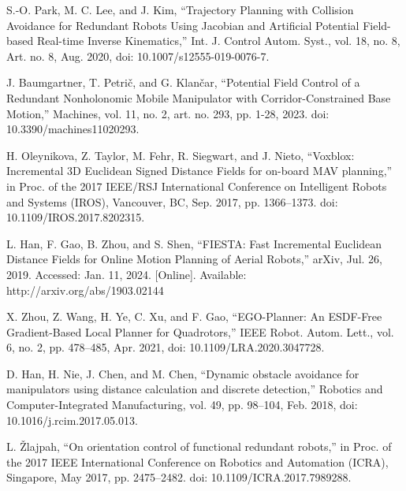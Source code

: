 \documentclass[letterpaper, 10 pt, conference]{ieeeconf}  %
\begin{document}
\begin{thebibliography}{99}
 S.-O. Park, M. C. Lee, and J. Kim, “Trajectory Planning with Collision Avoidance for Redundant Robots Using Jacobian and Artificial Potential Field-based Real-time Inverse Kinematics,” Int. J. Control Autom. Syst., vol. 18, no. 8, Art. no. 8, Aug. 2020, doi: 10.1007/s12555-019-0076-7.

J. Baumgartner, T. Petrič, and G. Klančar, “Potential Field Control of a Redundant Nonholonomic Mobile Manipulator with Corridor-Constrained Base Motion,” Machines, vol. 11, no. 2, art. no. 293, pp. 1-28, 2023. doi: 10.3390/machines11020293.

 H. Oleynikova, Z. Taylor, M. Fehr, R. Siegwart, and J. Nieto, “Voxblox: Incremental 3D Euclidean Signed Distance Fields for on-board MAV planning,” in Proc. of the 2017 IEEE/RSJ International Conference on Intelligent Robots and Systems (IROS), Vancouver, BC, Sep. 2017, pp. 1366–1373. doi: 10.1109/IROS.2017.8202315.

 L. Han, F. Gao, B. Zhou, and S. Shen, “FIESTA: Fast Incremental Euclidean Distance Fields for Online Motion Planning of Aerial Robots,” arXiv, Jul. 26, 2019. Accessed: Jan. 11, 2024. [Online]. Available: http://arxiv.org/abs/1903.02144

 X. Zhou, Z. Wang, H. Ye, C. Xu, and F. Gao, “EGO-Planner: An ESDF-Free Gradient-Based Local Planner for Quadrotors,” IEEE Robot. Autom. Lett., vol. 6, no. 2, pp. 478–485, Apr. 2021, doi: 10.1109/LRA.2020.3047728.

 D. Han, H. Nie, J. Chen, and M. Chen, “Dynamic obstacle avoidance for manipulators using distance calculation and discrete detection,” Robotics and Computer-Integrated Manufacturing, vol. 49, pp. 98–104, Feb. 2018, doi: 10.1016/j.rcim.2017.05.013.

L. Žlajpah, “On orientation control of functional redundant robots,” in Proc. of the 2017 IEEE International Conference on Robotics and Automation (ICRA), Singapore, May 2017, pp. 2475–2482. doi: 10.1109/ICRA.2017.7989288.



\end{thebibliography}
\end{document}

